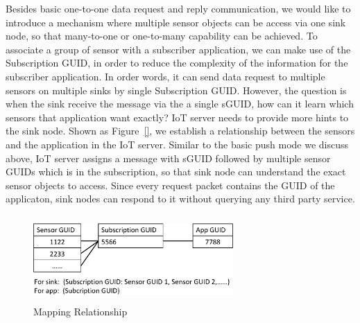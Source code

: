 Besides basic one-to-one data request and reply communication, we would like to introduce a mechanism where multiple sensor objects can be access via one sink node, so that many-to-one or one-to-many capability can be achieved. To associate a group of sensor with a subscriber application, we can make use of the Subscription GUID, in order to reduce the complexity of the information for the subscriber application. In order words, it can send data request to multiple sensors on multiple sinks by single Subscription GUID. However, the question is when the sink receive the message via the a single sGUID, how can it learn which sensors that application want exactly? IoT server needs to provide more hints to the sink node. Shown as Figure~\ref{}, we establish a relationship between the sensors and the application in the IoT server. Similar to the basic push mode we discuss above, IoT server assigns a message with sGUID followed by multiple sensor GUIDs which is in the subscription, so that sink node can understand the exact sensor objects to access. Since every request packet contains the GUID of the applicaton, sink nodes can respond to it without querying any third party service. 

\begin{figure}
\includegraphics [width=3.00in,height=1.30in]{two_step_pull.eps}
\caption{Mapping Relationship}
\end{figure}